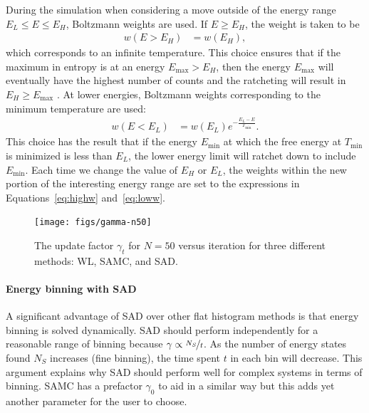 \documentclass[letterpaper,twocolumn,amsmath,amssymb,pre,aps,10pt]{revtex4-1}
\begin{document}
During the simulation when considering a move outside of the energy
range $E_L \le E \le E_H$, Boltzmann weights are used.  If $E\ge E_H$,
the weight is taken to be
\begin{align}\label{eq:highw}
  w(E>E_H) &= w(E_H),
\end{align}
which corresponds to an infinite temperature.
This choice ensures that
if the maximum in entropy is at an energy $E_{\max}>E_H$, then the energy
$E_{\max}$
will eventually have the highest number of counts and the ratcheting will
result in $E_H\ge E_{\max}$ .
At lower energies, Boltzmann weights corresponding to the minimum temperature
are used:
\begin{align}\label{eq:loww}
  w(E<E_L) &= w(E_L)e^{-\frac{E_L-E}{T_{\min}}}.
\end{align}
This choice has the result that if the energy $E_{\min}$ at which the free
energy at $T_{\min}$ is minimized is less than $E_L$, the lower energy
limit will ratchet down to include $E_{\min}$.
Each time we change the value of $E_H$ or $E_L$, the weights within the
new portion of the interesting energy range are set to the expressions
in Equations~\ref{eq:highw} and~\ref{eq:loww}.

\begin{figure}
  \texttt{[image: figs/gamma-n50]}
  \caption{The update factor $\gamma_t$ for $N=50$ versus iteration for three
    different methods: WL, SAMC, and SAD.}
\end{figure}

\paragraph{Energy binning with SAD}

A significant advantage of SAD over other flat histogram methods is
that energy binning is solved dynamically. SAD should perform
independently for a reasonable range of binning because $\gamma \propto
\nicefrac{N_S}{t}$.  As the number of energy states found $N_S$
increases (fine binning), the time spent $t$ in each bin will decrease.
This argument explains why SAD should perform well for complex systems
in terms of binning. SAMC has a prefactor $\gamma_0$ to aid in a
similar way but this adds yet another parameter for the user to choose.
\end{document}

